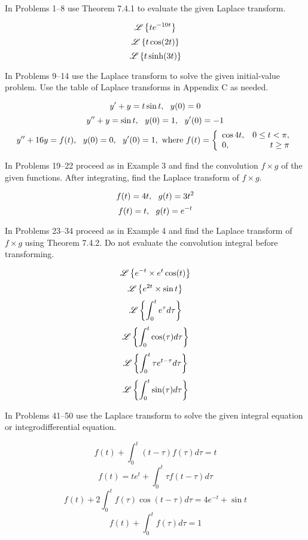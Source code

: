\documentclass[chapter=7,section=4]{math252homework}
\begin{document}
In Problems 1--8 use Theorem 7.4.1 to evaluate the given Laplace transform.
\begin{problems}
	\problem \[ \laplace[te^{-10t}] \]
	\setcounter{problemsi}{2}
	\problem \[ \laplace[t\cos(2t)] \]
	\setcounter{problemsi}{5}
	\problem \[ \laplace[t\sinh(3t)] \]
\end{problems}

In Problems 9--14 use the Laplace transform to solve the given initial-value problem. Use the table of Laplace transforms in Appendix C as needed.
\begin{problems}[start=9]
	\problem \[ y' + y = t\sin t,\mbox{{ }{ }} y(0)=0 \]
	\setcounter{problemsi}{11}
	\problem \[ y'' + y = \sin t,\mbox{{ }{ }} y(0)=1,\mbox{{ }{ }} y'(0)=-1 \]
	\problem \[ y'' + 16y = f(t),\mbox{{ }{ }} y(0)=0,\mbox{{ }{ }} y'(0)=1, \mbox{ where }\\f(t) = \left\{ \begin{array}{lr}
		\cos 4t, & 0 \leq t < \pi,\\
		0, & t \geq \pi
	\end{array} \right. \]
\end{problems}

In Problems 19--22 proceed as in Example 3 and find the convolution $f\times g$ of the given functions. After integrating, find the Laplace transform of $f\times g$.
\begin{problems}[start=19]
	\problem \[ f(t) = 4t,\mbox{{ }{ }} g(t) = 3t^{2} \]
	\problem \[ f(t) = t,\mbox{{ }{ }} g(t)=e^{-t} \]
\end{problems}

In Problems 23--34 proceed as in Example 4 and find the Laplace transform of $f\times g$ using Theorem 7.4.2. Do not evaluate the convolution integral before transforming.
\begin{problems}[start=25]
	\problem \[ \laplace[e^{-t}\times e^{t}\cos(t)] \]
	\problem \[ \laplace[e^{2t}\times\sin t] \]
	\problem \[ \laplace[\int_{0}^{t} e^{\tau}d\tau] \]
	\problem \[ \laplace[\int_{0}^{t} \cos(\tau) d\tau] \]
	\setcounter{problemsi}{30}
	\problem \[ \laplace[\int_{0}^{t} \tau e^{t-\tau}d\tau] \]
	\setcounter{problemsi}{32}
	\problem \[ \laplace[\int_{0}^{t} \sin(\tau)d\tau] \]
\end{problems}

In Problems 41--50 use the Laplace transform to solve the given integral equation or integrodifferential equation.
\begin{problems}[start=41]
	\problem \[ f(t) + \int_{0}^{t} (t-\tau)f(\tau)d\tau = t \]
	\setcounter{problemsi}{42}
	\problem \[ f(t) = te^{t} + \int_{0}^{t} \tau f(t-\tau)d\tau \]
	\problem \[ f(t) + 2\int_{0}^{t}f(\tau)\cos(t-\tau)d\tau = 4e^{-t} + \sin t  \]
	\problem \[ f(t) + \int_{0}^{t} f(\tau)d\tau = 1 \]
\end{problems}
\end{document}
